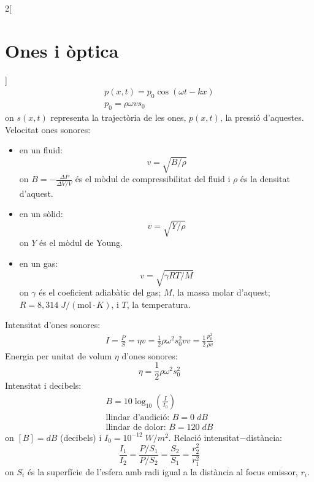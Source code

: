 \documentclass[../../../main.tex]{subfiles}
\begin{document}
\begin{multicols}{2}[\section{Ones i òptica}]
\begin{gather*}
    p(x,t)=p_0\cos\left(\omega t-kx\right)\\
    p_0=\rho\omega vs_0
  \end{gather*}
  {\footnotesize on $s(x,t)$ representa la trajectòria de les ones, $p(x,t)$, la pressió d'aquestes.}\newline
  Velocitat ones sonores:
  \begin{itemize}
    \item en un fluid: $$v=\sqrt{B/\rho}$$ {\footnotesize on $B=-\frac{\Delta P}{\Delta V/V}$ és el mòdul de com\-pres\-si\-bi\-li\-tat del fluid i $\rho$ és la densitat d'aquest.}
    \item en un sòlid:
          $$v=\sqrt{Y/\rho}$$ {\footnotesize on $Y$ és el mòdul de Young.}
    \item en un gas:
          $$v=\sqrt{\gamma RT/M}$$ {\footnotesize on $\gamma$ és el coeficient adiabàtic del gas; $M$, la massa molar d'aquest; $R=8,314\;J/(\text{mol}\cdot K)$, i $T$, la temperatura.}
  \end{itemize}
  Intensitat d'ones sonores:
  \begin{gather*}
    I=\frac{P}{S}=\eta v=\frac{1}{2}\rho\omega^2s_0^2v v=\frac{1}{2}\frac{p_0^2}{\rho v}
  \end{gather*}
  Energia per unitat de volum $\eta$ d'ones sonores:
  $$\eta=\frac{1}{2}\rho\omega^2s_0^2$$
  Intensitat i decibels:
  \begin{gather*}
    B=10\log_{10}\left(\frac{I}{I_0}\right)\\
    \text{llindar d'audició: }B= 0\;dB\\
    \text{llindar de dolor: }B= 120\;dB
  \end{gather*}
  {\footnotesize on $[B]=dB$ (decibels) i $I_0=10^{-12}\;W/m^2$.}
  Relació intensitat$-$distància: $$\frac{I_1}{I_2}=\frac{P/S_1}{P/S_2}=\frac{S_2}{S_1}=\frac{r_2^2}{r_1^2}$$ {\footnotesize on $S_i$ és la superfície de l'esfera amb radi igual a la distància al focus emissor, $r_i$.}

\end{multicols}
\end{document}
